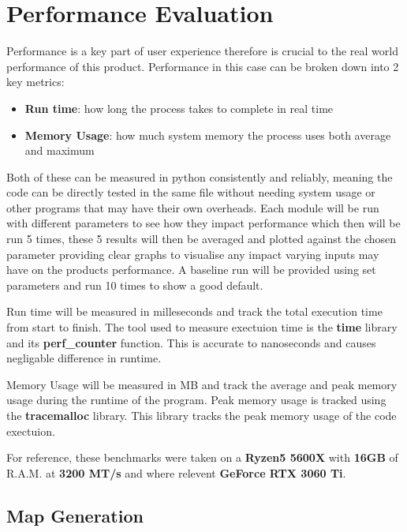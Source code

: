 \documentclass[final]{cmpreport_02}
\begin{document}


\section{Performance Evaluation}

Performance is a key part of user experience therefore is crucial to the real world performance of this product.
Performance in this case can be broken down into 2 key metrics:

\begin{itemize}
	\item{\textbf{Run time}: how long the process takes to complete in real time}
	\item{\textbf{Memory Usage}: how much system memory the process uses both average and maximum}
\end{itemize}

Both of these can be measured in python consistently and reliably, meaning the code can be directly tested in the same file without needing system usage or other programs that may have their own overheads.
Each module will be run with different parameters to see how they impact performance which then will be run 5 times,
these 5 results will then be averaged and plotted against the chosen parameter providing clear graphs to visualise any impact varying inputs may have on the products performance.
A baseline run will be provided using set parameters and run 10 times to show a good default.

Run time will be measured in milleseconds and track the total execution time from start to finish.
The tool used to measure exectuion time  is the \textbf{time} library and its \textbf{perf\_counter} function.
This is accurate to nanoseconds and causes negligable difference in runtime.

Memory Usage will be measured in MB and track the average and peak memory usage during the runtime of the program.
Peak memory usage is tracked using the \textbf{tracemalloc} library.
This library tracks the peak memory usage of the code exectuion.

For reference, these benchmarks were taken on a \textbf{Ryzen5 5600X} with \textbf{16GB} of R.A.M. at \textbf{3200 MT/s} and where relevent \textbf{GeForce RTX 3060 Ti}.

\subsection{Map Generation}
\end{document}
